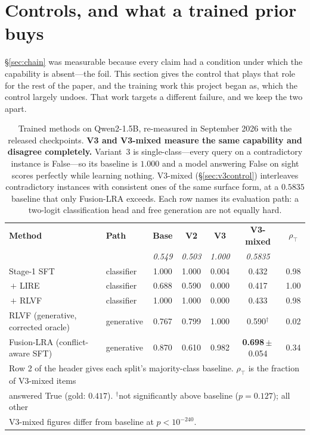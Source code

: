 \documentclass{article}
\begin{document}
\section{Controls, and what a trained prior buys}
\label{sec:trained}

\S\ref{sec:chain} was measurable because every claim had a condition under
which the capability is absent---the foil. This section gives the control that
plays that role for the rest of the paper, and the training work this project
began as, which the control largely undoes. That work targets a different
failure, and we keep the two apart.


\begin{table}[t]
    \centering
    \caption{Trained methods on Qwen2-1.5B, re-measured in September 2026 with
    the released checkpoints. \textbf{V3 and V3-mixed measure the same
    capability and disagree completely.} Variant~3 is single-class---every query
    on a contradictory instance is False---so its baseline is $1.000$ and a
    model answering False on sight scores perfectly while learning nothing.
    V3-mixed (\S\ref{sec:v3control}) interleaves contradictory instances with
    consistent ones of the same surface form, at a $0.5835$ baseline that only
    Fusion-LRA exceeds. Each row names its evaluation path: a two-logit
    classification head and free generation are not equally hard.}
    \label{tab:comparison_results}
    \setlength{\tabcolsep}{5pt}
    \renewcommand{\arraystretch}{1.05}
    \footnotesize
    \begin{tabular}{llccccc}
        \toprule
        \textbf{Method} & \textbf{Path} & \textbf{Base} & \textbf{V2} &
        \textbf{V3} & \textbf{V3-mixed} & $\rho_{\top}$ \\
        & & \emph{0.549} & \emph{0.503} & \emph{1.000} & \emph{0.5835} & \\
        \midrule
        Stage-1 SFT & classifier & 1.000 & 1.000 & 0.004 & 0.432 & 0.98 \\
        \,$+$ LIRE & classifier & 0.688 & 0.590 & 0.000 & 0.417 & 1.00 \\
        \,$+$ \textsc{RLVF} & classifier & 1.000 & 1.000 & 0.000 & 0.433 & 0.98 \\
        \textsc{RLVF} (generative, corrected oracle) & generative & 0.767 & 0.799 & 1.000 & 0.590$^{\dagger}$ & 0.02 \\
        \midrule
        \rowcolor{gray!10} Fusion-LRA (conflict-aware SFT) & generative &
        0.870 & 0.610 & 0.982 & \textbf{0.698}\,$\pm$\,0.054 & 0.34 \\
        \bottomrule
        \multicolumn{7}{l}{\footnotesize Row 2 of the header gives each split's
        majority-class baseline. $\rho_{\top}$ is the fraction of V3-mixed items} \\
        \multicolumn{7}{l}{\footnotesize answered True (gold: $0.417$).
        $^{\dagger}$not significantly above baseline ($p{=}0.127$); all other} \\
        \multicolumn{7}{l}{\footnotesize V3-mixed figures differ from baseline at
        $p{<}10^{-240}$.} \\
    \end{tabular}
\end{table}
\end{document}
